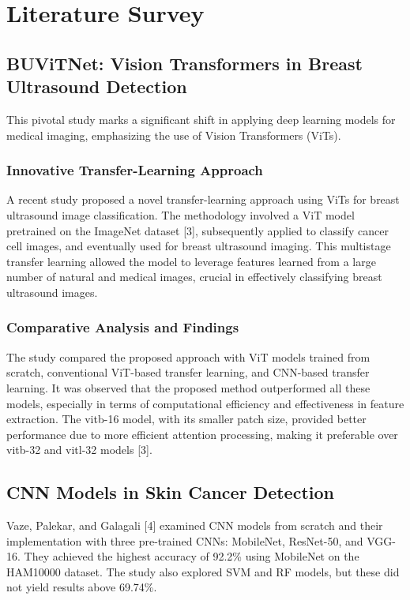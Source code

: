 \documentclass[conference]{IEEEtran}
\begin{document}
\section{Literature Survey}


\subsection{BUViTNet: Vision Transformers in Breast Ultrasound Detection}
This pivotal study marks a significant shift in applying deep learning models for medical imaging, emphasizing the use of Vision Transformers (ViTs).

\subsubsection{Innovative Transfer-Learning Approach}
A recent study proposed a novel transfer-learning approach using ViTs for breast ultrasound image classification. The methodology involved a ViT model pretrained on the ImageNet dataset [3], subsequently applied to classify cancer cell images, and eventually used for breast ultrasound imaging. This multistage transfer learning allowed the model to leverage features learned from a large number of natural and medical images, crucial in effectively classifying breast ultrasound images.

\subsubsection{Comparative Analysis and Findings}
The study compared the proposed approach with ViT models trained from scratch, conventional ViT-based transfer learning, and CNN-based transfer learning. It was observed that the proposed method outperformed all these models, especially in terms of computational efficiency and effectiveness in feature extraction. The vitb-16 model, with its smaller patch size, provided better performance due to more efficient attention processing, making it preferable over vitb-32 and vitl-32 models [3].

\subsection{CNN Models in Skin Cancer Detection}
Vaze, Palekar, and Galagali [4] examined CNN models from scratch and their implementation with three pre-trained CNNs: MobileNet, ResNet-50, and VGG-16. They achieved the highest accuracy of 92.2\% using MobileNet on the HAM10000 dataset. The study also explored SVM and RF models, but these did not yield results above 69.74\%.
\end{document}
